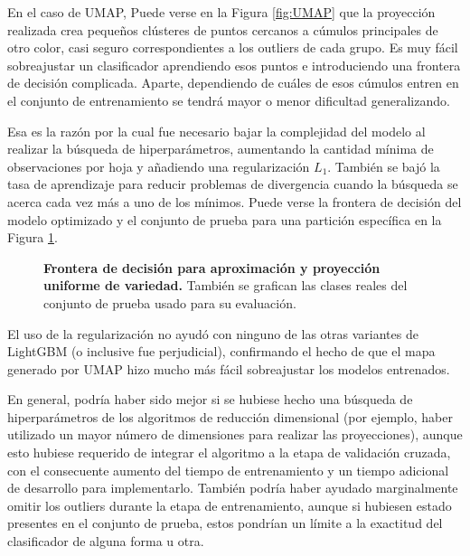 \documentclass[12pt]{article}
\begin{document}

En el caso de UMAP, Puede verse en la Figura \ref{fig:UMAP} que la proyección realizada crea pequeños clústeres de puntos cercanos a cúmulos principales de otro color, casi seguro correspondientes a los outliers de cada grupo. Es muy fácil sobreajustar un clasificador aprendiendo esos puntos e introduciendo una frontera de decisión complicada. Aparte, dependiendo de cuáles de esos cúmulos entren en el conjunto de entrenamiento se tendrá mayor o menor dificultad generalizando.

Esa es la razón por la cual fue necesario bajar la complejidad del modelo al realizar la búsqueda de hiperparámetros, aumentando la cantidad mínima de observaciones por hoja y añadiendo una regularización $L_1$. También se bajó la tasa de aprendizaje para reducir problemas de divergencia cuando la búsqueda se acerca cada vez más a uno de los mínimos. Puede verse la frontera de decisión del modelo optimizado y el conjunto de prueba para una partición específica en la Figura \ref{fig:BoundaryUMAP}.

\begin{figure}[htbp]
    \centering
    
    \caption{\textbf{Frontera de decisión para aproximación y proyección uniforme de variedad.} También se grafican las clases reales del conjunto de prueba usado para su evaluación.}
    \label{fig:BoundaryUMAP}
\end{figure}

El uso de la regularización no ayudó con ninguno de las otras variantes de LightGBM (o inclusive fue perjudicial), confirmando el hecho de que el mapa generado por UMAP hizo mucho más fácil sobreajustar los modelos entrenados.

En general, podría haber sido mejor si se hubiese hecho una búsqueda de hiperparámetros de los algoritmos de reducción dimensional (por ejemplo, haber utilizado un mayor número de dimensiones para realizar las proyecciones), aunque esto hubiese requerido de integrar el algoritmo a la etapa de validación cruzada, con el consecuente aumento del tiempo de entrenamiento y un tiempo adicional de desarrollo para implementarlo. También podría haber ayudado marginalmente omitir los outliers durante la etapa de entrenamiento, aunque si hubiesen estado presentes en el conjunto de prueba, estos pondrían un límite a la exactitud del clasificador de alguna forma u otra. 
\end{document}
